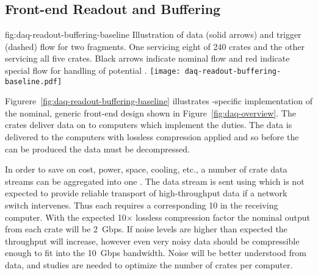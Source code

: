 \subsection{Front-end Readout and Buffering}
\label{sec:fd-daq-fero}


\begin{dunefigure}{fig:daq-readout-buffering-baseline}
  {Illustration of data (solid arrows) and trigger (dashed) flow for
    two \dual {}  fragments. 
    One servicing eight of \num{240}  crates and the other servicing all
    five  crates.  
    Black arrows indicate nominal flow and red indicate special flow
    for handling of potential .} 
  \texttt{[image: daq-readout-buffering-baseline.pdf]}%
\end{dunefigure}

Figurere~\ref{fig:daq-readout-buffering-baseline} illustrates
\dual-specific implementation of the nominal, generic  front-end
 design shown in Figure~\ref{fig:daq-overview}. 
The  crates deliver data on  to  computers
which implement the  duties.
The  data is delivered to the   computers with lossless
compression applied and so before the  can be
produced the data must be decompressed. 

In order to save on cost, power, space, cooling, etc., a number of 
crate data streams can be aggregated into one . 
The  data stream is sent using  which is not expected to provide
reliable transport of high-throughput data if a network switch
intervenes. 
Thus each  requires a corresponding \SI{10}{\Gbps}  in the receiving
 computer.
With the expected 10$\times$ lossless compression factor the nominal
output from each  crate will be \SI{2}{Gbps}. 
If noise levels are higher than expected the throughput will increase,
however even very noisy data should be compressible enough to fit into
the \SI{10}{Gbps} bandwidth. 
Noise will be better understood from  data, and studies
are needed to optimize the number of  crates per 
computer.

